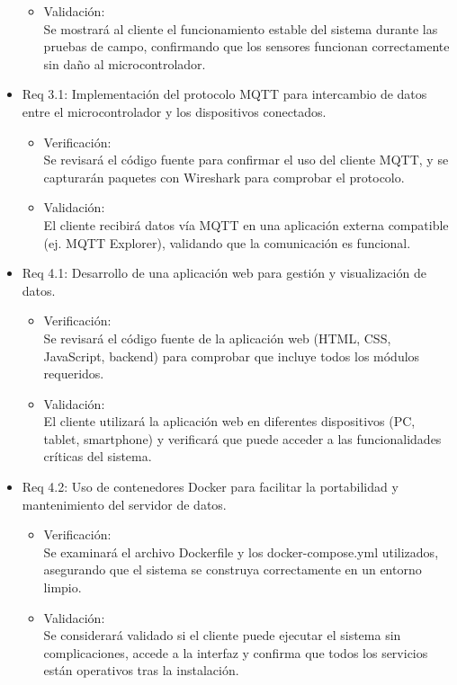 \documentclass[
11pt, %
]{charter}
\begin{document}
\begin{itemize}
\begin{itemize}
	\item Validación: \\ Se mostrará al cliente el funcionamiento estable del sistema durante las pruebas de campo, confirmando que los sensores funcionan correctamente sin daño al microcontrolador.
\end{itemize}

\item Req 3.1: Implementación del protocolo MQTT para intercambio de datos entre el microcontrolador y los dispositivos conectados.

\begin{itemize}
	\item Verificación: \\ Se revisará el código fuente para confirmar el uso del cliente MQTT, y se capturarán paquetes con Wireshark para comprobar el protocolo.
	
	\item Validación: \\ El cliente recibirá datos vía MQTT en una aplicación externa compatible (ej. MQTT Explorer), validando que la comunicación es funcional.
\end{itemize}

\item Req 4.1: Desarrollo de una aplicación web para gestión y visualización de datos.
\begin{itemize}
	\item Verificación: \\ Se revisará el código fuente de la aplicación web (HTML, CSS, JavaScript, backend) para comprobar que incluye todos los módulos requeridos.
	
	\item Validación: \\ El cliente utilizará la aplicación web en diferentes dispositivos (PC, tablet, smartphone) y verificará que puede acceder a las funcionalidades críticas del sistema.
	\end{itemize}
	
\item Req 4.2: Uso de contenedores Docker para facilitar la portabilidad y mantenimiento del servidor de datos.
\begin{itemize}
	\item Verificación: \\ Se examinará el archivo Dockerfile y los docker-compose.yml utilizados, asegurando que el sistema se construya correctamente en un entorno limpio. 

	\item Validación: \\ Se considerará validado si el cliente puede ejecutar el sistema sin complicaciones, accede a la interfaz y confirma que todos los servicios están operativos tras la instalación.
\end{itemize}

\end{itemize}
\end{document}
